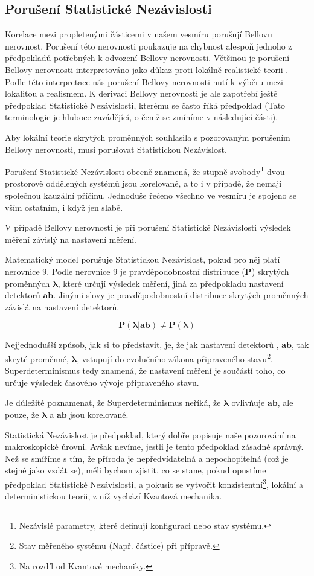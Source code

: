 \clearpage

\subsection{Porušení Statistické Nezávislosti}
Korelace mezi propletenými částicemi v našem vesmíru porušují Bellovu nerovnost. Porušení této nerovnosti poukazuje na chybnost alespoň jednoho z předpokladů potřebných k odvození Bellovy nerovnosti. Většinou je porušení Bellovy nerovnosti interpretováno jako důkaz proti lokálně realistické teorii \parencite{belltest:violation}. Podle této interpretace nás porušení Bellovy nerovnosti nutí k výběru mezi lokalitou a realismem. K derivaci Bellovy nerovnosti je ale zapotřebí ještě předpoklad Statistické Nezávislosti, kterému se často říká předpoklad  (Tato terminologie je hluboce zavádějící, o čemž se zmíníme v následující části).

Aby lokální teorie skrytých proměnných souhlasila s pozorovaným porušením Bellovy nerovnosti, musí porušovat Statistickou Nezávislost.

Porušení Statistické Nezávislosti obecně znamená, že stupně svobody\footnote[10]{Nezávislé parametry, které definují konfiguraci nebo stav systému.} dvou prostorově oddělených systémů jsou korelované, a to i v případě, že nemají společnou kauzální příčinu. Jednoduše řečeno všechno ve vesmíru je spojeno se vším ostatním, i když jen slabě. 

V případě Bellovy nerovnosti je při porušení Statistické Nezávislosti výsledek měření závislý na nastavení měření. 

Matematický model porušuje Statistickou Nezávislost, pokud pro něj platí nerovnice 9. Podle nerovnice 9 je pravděpodobnostní distribuce ($\bm{P}$) skrytých proměnných $\bm{\lambda}$, které určují výsledek měření, jiná za předpokladu nastavení detektorů $\bm{ab}$. Jinými slovy je pravděpodobnostní distribuce skrytých proměnných závislá na nastavení detektorů.

\begin{equation}
    \bm{P(\lambda|ab) \neq P(\lambda)}
    \label{eq:9}
\end{equation}

Nejjednodušší způsob, jak si to představit, je, že jak nastavení detektorů , $\bm{ab}$, tak skryté proměnné, $\bm{\lambda}$, vstupují do evolučního zákona připraveného stavu\footnote[11]{Stav měřeného systému (Např. částice) při přípravě.}. Superdeterminismus tedy znamená, že nastavení měření je součástí toho, co určuje výsledek časového vývoje připraveného stavu.

Je důležité poznamenat, že Superdeterminismus neříká, že $\bm{\lambda}$ ovlivňuje $\bm{ab}$, ale pouze, že $\bm{\lambda}$ a $\bm{ab}$ jsou korelované.

Statistická Nezávislost je předpoklad, který dobře popisuje naše pozorování na ma\-kroskopické úrovni. Avšak nevíme, jestli je tento předpoklad zásadně správný. Než se smíříme s tím, že příroda je nepředvídatelná a nepochopitelná (což je stejné jako vzdát se), měli bychom zjistit, co se stane, pokud opustíme předpoklad Statistické Nezávislosti, a pokusit se vytvořit konzistentní\footnote[12]{Na rozdíl od Kvantové mechaniky.}, lokální a deterministickou teorii, z níž vychází Kvantová mechanika.
